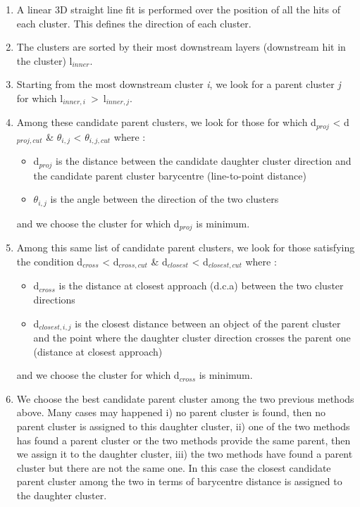 \documentclass[cits]{JINST}
\begin{document}
\begin{enumerate}
  \item A linear 3D straight line fit is performed over the position of all the hits of each cluster. This defines the direction of each cluster.
  \item The clusters are sorted by their most downstream layers (downstream hit in the cluster) l$_{inner}$.
  \item Starting from the most downstream cluster \textit{i}, we look for a parent cluster \textit{j} for which l$_{inner,i}$~>~l$_{inner,j}$.
  \item Among these candidate parent clusters, we look for those for which d$_{proj}$ < d$_{proj,cut}$ \& $\theta_{i,j}$ < $\theta_{i,j,cut}$  where :
  \begin{itemize}
    \item d$_{proj}$ is the distance between the candidate daughter cluster direction and the candidate parent cluster barycentre (line-to-point distance)
    \item $\theta_{i,j}$ is the angle between the direction of the two clusters
  \end{itemize}
  and we choose the cluster for which d$_{proj}$ is minimum.  
  \item Among this same list of candidate parent clusters, we look for those satisfying the condition d$_{cross}$ < d$_{cross,cut}$ \& d$_{closest}$ < d$_{closest,cut}$ where :
  \begin{itemize}
    \item d$_{cross}$ is the distance at closest approach (d.c.a) between the two cluster directions
    \item d$_{closest,i,j}$ is the closest distance between an object of the parent cluster and the point where the daughter cluster direction crosses the parent one (distance at closest approach) 
  \end{itemize}
  and we choose the cluster for which d$_{cross}$ is minimum.
  \item We choose the best candidate parent cluster among the two previous methods above. Many cases may happened i) no parent cluster is found, then no parent cluster is assigned to this daughter cluster, ii) one of the two methods has found a parent cluster or the two methods provide the same parent, then we assign it to the daughter cluster, iii) the two methods have found a parent cluster but there are not the same one. In this case the closest candidate parent cluster among the two in terms of barycentre distance is assigned to the daughter cluster.

\end{enumerate}
\end{document}
